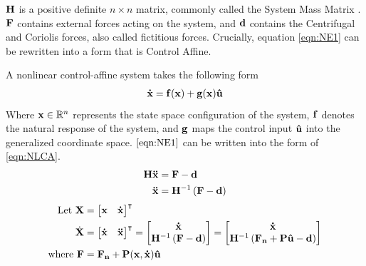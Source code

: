 \noindent ${\mathbf{H}}$ is a positive definite $n \times n$ matrix, commonly called the System Mass Matrix \cite{riley_hobson_bence_2006}. ${\mathbf{F}}$ contains external forces acting on the system, and ${\mathbf{d}}$ contains the Centrifugal and Coriolis forces, also called fictitious forces. Crucially, equation \ref{eqn:NE1} can be rewritten into a form that is Control Affine. \newline

A nonlinear control-affine system takes the following form
\begin{align} \label{eqn:NLCA}
    {\mathbf{\dot{x}}} = \mathbf{f}({\mathbf{{x}}}) + \mathbf{g}({\mathbf{{x}}}) \mathbf{\hat{u}}
\end{align}
\noindent Where ${\mathbf{{x}}} \in \mathbb{R}^n$ represents the state space configuration of the system, $\mathbf{f}$ denotes the natural response of the system, and $\mathbf{g}$ maps the control input $\mathbf{\hat{u}}$ into the generalized coordinate space. $\ref{eqn:NE1}$ can be written into the form of \ref{eqn:NLCA}.
\begin{align*}
    {\mathbf{H}} {\mathbf{\Ddot{x}}} &= {\mathbf{F}}  - {\mathbf{d}}  \\ \nonumber
    {\mathbf{\Ddot{x}}} &= {\mathbf{H}}^{-1}\left ({\mathbf{F}}  - {\mathbf{d}} \right ) 
\end{align*}
\begin{align*} \nonumber
\text{Let  }  \mathbf{X} &= \begin{bmatrix} {\mathbf{{x}}} & {\mathbf{\dot{x}}} \end{bmatrix}^\intercal \\
    \dot{\mathbf{X}} &= \begin{bmatrix}
     {\mathbf{\dot{x}}} &{\mathbf{\Ddot{x}}}
    \end{bmatrix}^\intercal 
    =
    \begin{bmatrix}
     {\mathbf{\dot{x}}} \\ {\mathbf{H}} ^{-1}\left ({\mathbf{F}}  - {\mathbf{d}} \right ) 
    \end{bmatrix} 
    =
    \begin{bmatrix}
     {\mathbf{\dot{x}}} \\ {\mathbf{H}} ^{-1}\left ({\mathbf{F_n}}  + \mathbf{P}\mathbf{\hat{u}} - {\mathbf{d}} \right )
    \end{bmatrix} \\
    \text{where } {\mathbf{F}} &= {\mathbf{F_n}}  + \mathbf{P}({\mathbf{{x}}}, {\mathbf{\dot{x}}})\mathbf{\hat{u}} 
    \end{align*}
